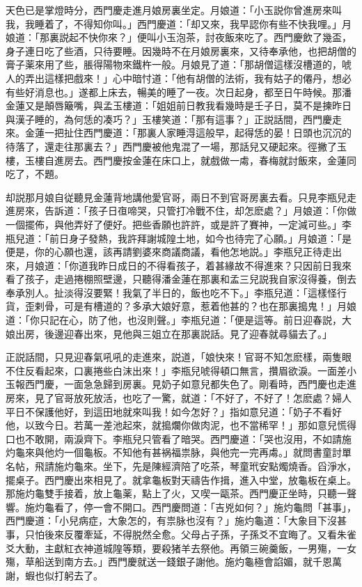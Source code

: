 天色已是掌燈時分，西門慶走進月娘房裏坐定。月娘道：「小玉説你曾進房來叫我，我睡着了，不得知你叫。」西門慶道：「却又來，我早認你有些不快我哩。」月娘道：「那裏説起不快你來？」便叫小玉泡茶，討夜飯來吃了。西門慶飲了幾盃，身子連日吃了些酒，只待要睡。因幾時不在月娘房裏來，又待奉承他，也把胡僧的膏子薬來用了些，脹得陽物來鐵杵一般。月娘見了道：「那胡僧這樣沒槽道的，唬人的弄出這樣把戲來！」心中暗忖道：「他有胡僧的法術，我有姑子的僊丹，想必有些好消息也。」遂都上床去，暢美的睡了一夜。次日起身，都至日午時候。那潘金蓮又是顛唇簸嘴，與孟玉樓道：「姐姐前日教我看幾時是壬子日，莫不是揀昨日與漢子睡的，為何恁的凑巧？」玉樓笑道：「那有這事？」正説話間，西門慶走來。金蓮一把扯住西門慶道：「那裏人家睡淂這般早，起得恁的晏！日頭也沉沉的待落了，還走往那裏去？」西門慶被他鬼混了一場，那話兒又硬起來。徑撇了玉樓，玉樓自進房去。西門慶按金蓮在床口上，就戲做一䖏，春梅就討飯來，金蓮同吃了，不題。

却説那月娘自従聽見金蓮背地講他愛官哥，兩日不到官哥房裏去看。只見李瓶兒走進房來，告訴道：「孩子日亱啼哭，只管打冷戰不住，却怎麽處？」月娘道：「你做一個擺佈，與他弄好了便好。把些香願也許許，或是許了賽神，一定減可些。」李瓶兒道：「前日身子發熱，我許拜謝城隍土地，如今也待完了心願。」月娘道：「是便是，你的心願也還，該再請劉婆來商議商議，看他怎地説。」李瓶兒正待走出來，月娘道：「你道我昨日成日的不得看孩子，着甚緣故不得進來？只因前日我來看了孩子，走過捲棚照壁邊，只聽得潘金蓮在那裏和孟三兒説我自家沒得養，倒去奉承別人。扯淡得沒要緊！我氣了半日的，飯也吃不下。」李瓶兒道：「這樣怪行貨，歪剌骨，可是有槽道的？多承大娘好意，惹着他甚的？也在那裏搗鬼！」月娘道：「你只記在心，防了他，也沒則聲。」李瓶兒道：「便是這等。前日迎春説，大娘出房，後邊迎春出來，見他與三姐立在那裏説話。見了迎春就尋貓去了。」

正説話間，只見迎春氣吼吼的走進來，説道，「娘快來！官哥不知怎麽樣，兩隻眼不住反看起來，口裏捲些白沫出來！」李瓶兒唬得頓口無言，攢眉欲淚。一面差小玉報西門慶，一面急急歸到房裏。見奶子如意兒都失色了。剛看時，西門慶也走進房來，見了官哥放死放活，也吃了一驚，就道：「不好了，不好了！怎麽處？婦人平日不保護他好，到這田地就來叫我！如今怎好？」指如意兒道：「奶子不看好他，以致今日。若萬一差池起來，就搗爛你做肉泥，也不當稀罕！」那如意兒慌得口也不敢開，兩淚齊下。李瓶兒只管看了暗哭。西門慶道：「哭也沒用，不如請施灼龜來與他灼一個龜板。不知他有甚祸福祟脉，與他完一完再䖏。」就問書童討單名帖，飛請施灼龜來。坐下，先是陳經濟陪了吃茶，琴童玳安點燭燒香。舀淨水，擺桌子。西門慶出來相見了。就拿龜板對天禱告作揖，進入中堂，放龜板在桌上。那施灼龜雙手接着，放上龜薬，點上了火，又喫一甌茶。西門慶正坐時，只聽一聲響。施灼龜看了，停一會不開口。西門慶問道：「吉兇如何？」施灼龜問「甚事」，西門慶道：「小兒病症，大象怎的，有祟脉也沒有？」施灼龜道：「大象目下沒甚事，只怕後來反覆牽延，不得脱然全愈。父母占子孫，子孫爻不宜晦了。又看朱雀爻大動，主獻紅衣神道城隍等類，要殺猪羊去祭他。再領三碗羹飯，一男殤，一女殤，草船送到南方去。」西門慶就送一錢銀子謝他。施灼龜極會諂媚，就千恩萬謝，蝦也似打躬去了。


